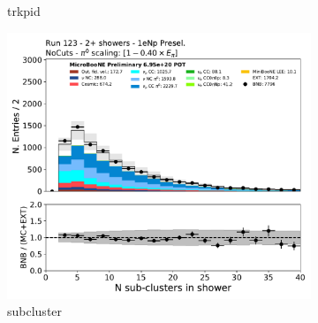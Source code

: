 \begin{figure}[H]
\begin{subfigure}{0.3\textwidth}
    \caption{trkpid}
    \end{subfigure}
    \begin{subfigure}{0.3\textwidth}
    \includegraphics[width=1.0\textwidth]{Sidebands/Figures/1eNp/TwoShower/TwoPShr_NP_None_pi0e040/subcluster.pdf}
    \caption{subcluster}
    \end{subfigure}
    \caption{} 
    \label{fig:TWOP_1eNp_2}
\end{figure}

